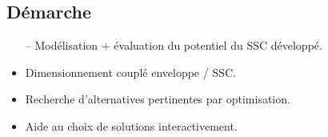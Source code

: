 \documentclass[xcolor=x11names, compress, 11pt]{beamer}
\begin{document}
\subsection{Démarche}
\begin{frame}[t]
    \vfill
    \begin{itemize}
        \item[--] Modélisation + évaluation du potentiel du SSC développé.
        \item<2->[--] Dimensionnement couplé enveloppe / SSC.
        \item<3->[--] Recherche d’alternatives pertinentes par optimisation.
        \item<4->[--] Aide au choix de solutions interactivement.
    \end{itemize}
    \vfill
\end{frame}
\end{document}

